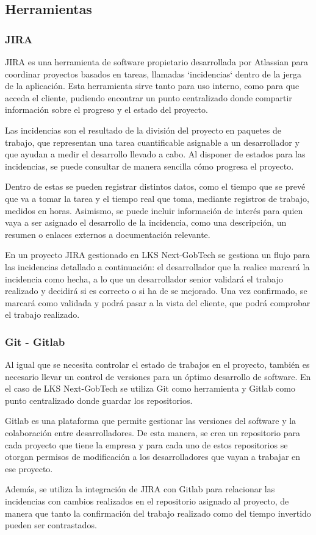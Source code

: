 \subsection{Herramientas}
\subsubsection{JIRA}
JIRA es una herramienta de software propietario desarrollada por Atlassian para coordinar proyectos basados en tareas, llamadas `incidencias` dentro de la jerga de la aplicación. Esta herramienta sirve tanto para uso interno, como para que acceda el cliente, pudiendo encontrar un punto centralizado donde compartir información sobre el progreso y el estado del proyecto.

Las incidencias son el resultado de la división del proyecto en paquetes de trabajo, que representan una tarea cuantificable asignable a un desarrollador y que ayudan a medir el desarrollo llevado a cabo. Al disponer de estados para las incidencias, se puede consultar de manera sencilla cómo progresa el proyecto. 

Dentro de estas se pueden registrar distintos datos, como el tiempo que se prevé que va a tomar la tarea y el tiempo real que toma, mediante registros de trabajo, medidos en horas. Asimismo, se puede incluir información de interés para quien vaya a ser asignado el desarrollo de la incidencia, como una descripción, un resumen o enlaces externos a documentación relevante.

En un proyecto JIRA gestionado en LKS Next-GobTech se gestiona un flujo para las incidencias detallado a continuación: el desarrollador que la realice marcará la incidencia como hecha, a lo que un desarrollador senior validará el trabajo realizado y decidirá si es correcto o si ha de se mejorado. Una vez confirmado, se marcará como validada y podrá pasar a la vista del cliente, que podrá comprobar el trabajo realizado.

\subsubsection{Git - Gitlab}
Al igual que se necesita controlar el estado de trabajos en el proyecto, también es necesario llevar un control de versiones para un óptimo desarrollo de software. En el caso de LKS Next-GobTech se utiliza Git \cite{chacon2014progit} como herramienta y Gitlab como punto centralizado donde guardar los repositorios. 

Gitlab es una plataforma que permite gestionar las versiones del software y la colaboración entre desarrolladores. De esta manera, se crea un repositorio para cada proyecto que tiene la empresa y para cada uno de estos repositorios se otorgan permisos de modificación a los desarrolladores que vayan a trabajar en ese proyecto.

Además, se utiliza la integración de JIRA con Gitlab para relacionar las incidencias con cambios realizados en el repositorio asignado al proyecto, de manera que tanto la confirmación del trabajo realizado como del tiempo invertido pueden ser contrastados.